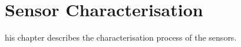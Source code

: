 \let\textcircled=\pgftextcircled
\chapter{Sensor Characterisation}
\label{chap:characterisation}

his chapter describes the characterisation process of the sensors.

